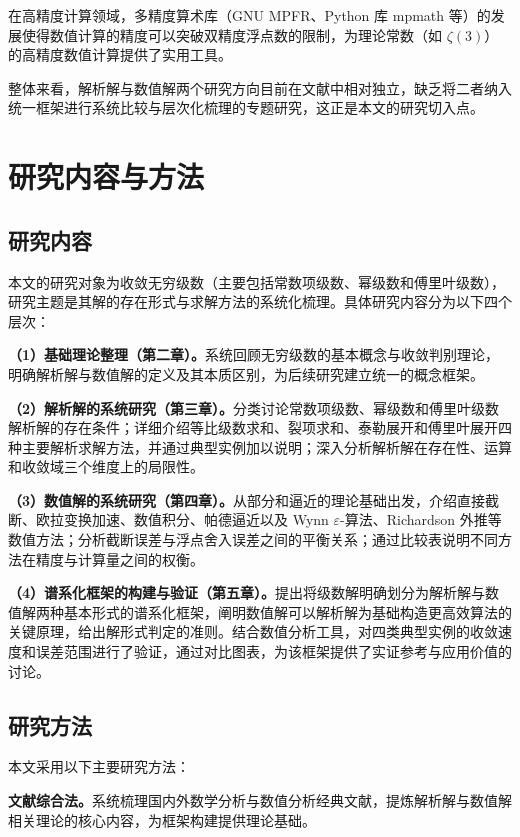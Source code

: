在高精度计算领域，多精度算术库（GNU MPFR、Python 库 mpmath 等）的发展使得数值计算的精度可以突破双精度浮点数的限制，为理论常数（如 $\zeta(3)$）的高精度数值计算提供了实用工具。

整体来看，解析解与数值解两个研究方向目前在文献中相对独立，缺乏将二者纳入统一框架进行系统比较与层次化梳理的专题研究，这正是本文的研究切入点。

\section{研究内容与方法}

\subsection{研究内容}

本文的研究对象为收敛无穷级数（主要包括常数项级数、幂级数和傅里叶级数），研究主题是其解的存在形式与求解方法的系统化梳理。具体研究内容分为以下四个层次：

\textbf{（1）基础理论整理（第二章）。}系统回顾无穷级数的基本概念与收敛判别理论，明确解析解与数值解的定义及其本质区别，为后续研究建立统一的概念框架。

\textbf{（2）解析解的系统研究（第三章）。}分类讨论常数项级数、幂级数和傅里叶级数解析解的存在条件；详细介绍等比级数求和、裂项求和、泰勒展开和傅里叶展开四种主要解析求解方法，并通过典型实例加以说明；深入分析解析解在存在性、运算和收敛域三个维度上的局限性。

\textbf{（3）数值解的系统研究（第四章）。}从部分和逼近的理论基础出发，介绍直接截断、欧拉变换加速、数值积分、帕德逼近以及 Wynn $\varepsilon$-算法、Richardson 外推等数值方法；分析截断误差与浮点舍入误差之间的平衡关系；通过比较表说明不同方法在精度与计算量之间的权衡。

\textbf{（4）谱系化框架的构建与验证（第五章）。}提出将级数解明确划分为解析解与数值解两种基本形式的谱系化框架，阐明数值解可以解析解为基础构造更高效算法的关键原理，给出解形式判定的准则。结合数值分析工具，对四类典型实例的收敛速度和误差范围进行了验证，通过对比图表，为该框架提供了实证参考与应用价值的讨论。

\subsection{研究方法}

本文采用以下主要研究方法：

\textbf{文献综合法。}系统梳理国内外数学分析与数值分析经典文献，提炼解析解与数值解相关理论的核心内容，为框架构建提供理论基础。

